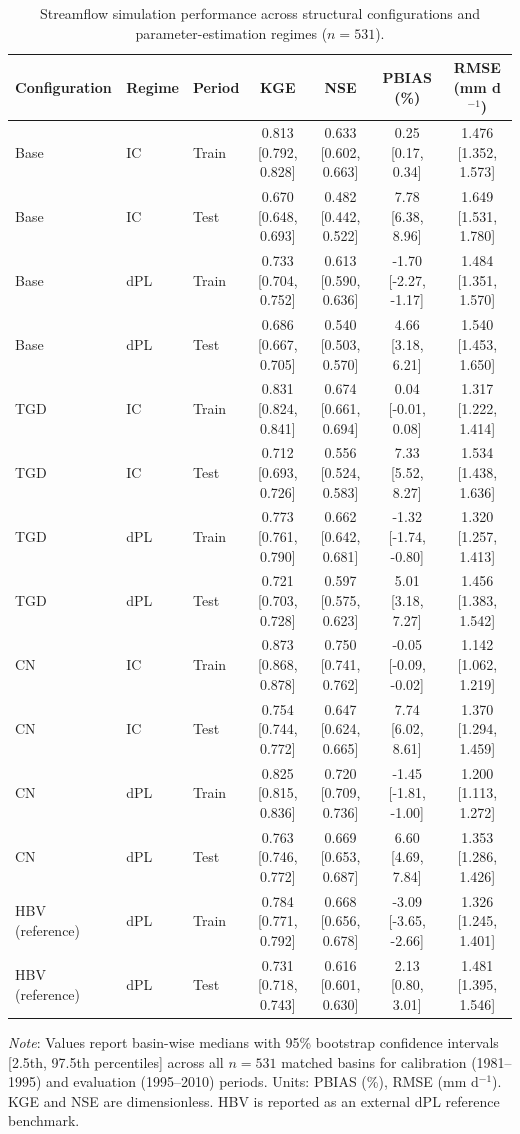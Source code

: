 \begin{table}[t]
\centering
\caption{Streamflow simulation performance across structural configurations and parameter-estimation regimes ($n = 531$).}
\label{tab:table1_absolute_performance}
\begin{threeparttable}
\begin{tabular}{lllcccc}
\toprule
Configuration & Regime & Period & KGE & NSE & PBIAS (\%) & RMSE (mm d$^{-1}$) \\
\midrule
Base & IC & Train & 0.813 [0.792, 0.828] & 0.633 [0.602, 0.663] & 0.25 [0.17, 0.34] & 1.476 [1.352, 1.573] \\
Base & IC & Test & 0.670 [0.648, 0.693] & 0.482 [0.442, 0.522] & 7.78 [6.38, 8.96] & 1.649 [1.531, 1.780] \\
Base & dPL & Train & 0.733 [0.704, 0.752] & 0.613 [0.590, 0.636] & -1.70 [-2.27, -1.17] & 1.484 [1.351, 1.570] \\
Base & dPL & Test & 0.686 [0.667, 0.705] & 0.540 [0.503, 0.570] & 4.66 [3.18, 6.21] & 1.540 [1.453, 1.650] \\
TGD & IC & Train & 0.831 [0.824, 0.841] & 0.674 [0.661, 0.694] & 0.04 [-0.01, 0.08] & 1.317 [1.222, 1.414] \\
TGD & IC & Test & 0.712 [0.693, 0.726] & 0.556 [0.524, 0.583] & 7.33 [5.52, 8.27] & 1.534 [1.438, 1.636] \\
TGD & dPL & Train & 0.773 [0.761, 0.790] & 0.662 [0.642, 0.681] & -1.32 [-1.74, -0.80] & 1.320 [1.257, 1.413] \\
TGD & dPL & Test & 0.721 [0.703, 0.728] & 0.597 [0.575, 0.623] & 5.01 [3.18, 7.27] & 1.456 [1.383, 1.542] \\
CN & IC & Train & 0.873 [0.868, 0.878] & 0.750 [0.741, 0.762] & -0.05 [-0.09, -0.02] & 1.142 [1.062, 1.219] \\
CN & IC & Test & 0.754 [0.744, 0.772] & 0.647 [0.624, 0.665] & 7.74 [6.02, 8.61] & 1.370 [1.294, 1.459] \\
CN & dPL & Train & 0.825 [0.815, 0.836] & 0.720 [0.709, 0.736] & -1.45 [-1.81, -1.00] & 1.200 [1.113, 1.272] \\
CN & dPL & Test & 0.763 [0.746, 0.772] & 0.669 [0.653, 0.687] & 6.60 [4.69, 7.84] & 1.353 [1.286, 1.426] \\
HBV (reference) & dPL & Train & 0.784 [0.771, 0.792] & 0.668 [0.656, 0.678] & -3.09 [-3.65, -2.66] & 1.326 [1.245, 1.401] \\
HBV (reference) & dPL & Test & 0.731 [0.718, 0.743] & 0.616 [0.601, 0.630] & 2.13 [0.80, 3.01] & 1.481 [1.395, 1.546] \\
\bottomrule
\end{tabular}
\begin{tablenotes}[flushleft]
\small
\item \textit{Note}: Values report basin-wise medians with 95\% bootstrap confidence intervals [2.5th, 97.5th percentiles] across all $n = 531$ matched basins for calibration (1981--1995) and evaluation (1995--2010) periods. Units: PBIAS (\%), RMSE (mm d$^{-1}$). KGE and NSE are dimensionless. HBV is reported as an external dPL reference benchmark.
\end{tablenotes}
\end{threeparttable}
\end{table}
